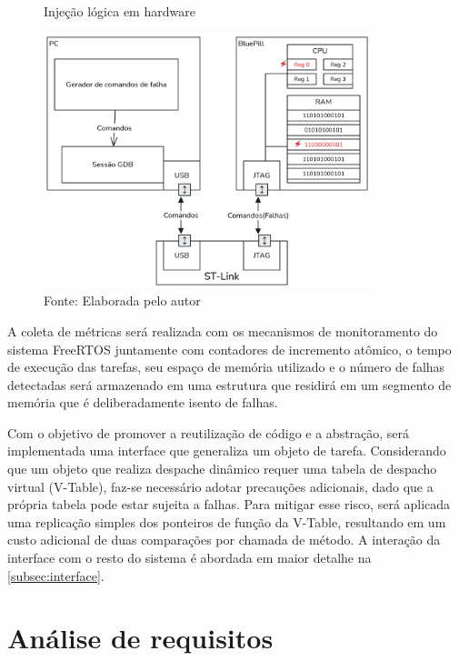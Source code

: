 \begin{figure}[H]
   \centering
   \captionsetup{justification=centering}
   \caption{Injeção lógica em hardware}
   \includegraphics[width=0.85\textwidth]{assets/injecao_hardware.png}
   \captionsetup{justification=raggedright}
  \caption*{Fonte: Elaborada pelo autor}
   \label{fig:injecaoHardwareLogica}
\end{figure}

A coleta de métricas será realizada com os mecanismos de monitoramento do sistema FreeRTOS juntamente com contadores de incremento atômico, o tempo de execução das tarefas, seu espaço de memória utilizado e o número de falhas detectadas será armazenado em uma estrutura que residirá em um segmento de memória que é deliberadamente isento de falhas.

Com o objetivo de promover a reutilização de código e a abstração, será implementada uma interface que generaliza um objeto de tarefa. Considerando que um objeto que realiza despache dinâmico requer uma tabela de despacho virtual (V-Table), faz-se necessário adotar precauções adicionais, dado que a própria tabela pode estar sujeita a falhas. Para mitigar esse risco, será aplicada uma replicação simples dos ponteiros de função da V-Table, resultando em um custo adicional de duas comparações por chamada de método. A interação da interface com o resto do sistema é abordada em maior detalhe na \autoref{subsec:interface}.

\section{Análise de requisitos}
\label{sec:req}

